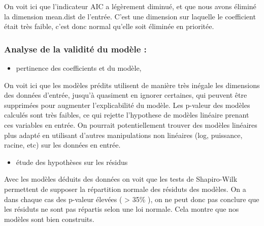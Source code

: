 \documentclass[
]{article}
\providecommand{\tightlist}{%
  \setlength{\itemsep}{0pt}\setlength{\parskip}{0pt}}
\begin{document}
On voit ici que l'indicateur AIC a légèrement diminué, et que nous avons
éliminé la dimension mean.dist de l'entrée. C'est une dimension sur
laquelle le coefficient était très faible, c'est donc normal qu'elle
soit éliminée en prioritée.

\hypertarget{analyse-de-la-validituxe9-du-moduxe8le}{%
\subsubsection{Analyse de la validité du modèle
:}\label{analyse-de-la-validituxe9-du-moduxe8le}}

\begin{itemize}
\tightlist
\item
  pertinence des coefficients et du modèle,
\end{itemize}

On voit ici que les modèles prédits utilisent de manière très inégale
les dimensions des données d'entrée, jusqu'à quasiment en ignorer
certaines, qui peuvent être supprimées pour augmenter l'explicabilité du
modèle. Les p-valeur des modèles calculés sont très faibles, ce qui
rejette l'hypothese de modèles linéaire prenant ces variables en entrée.
On pourrait potentiellement trouver des modèles linéaires plus adapté en
utilisant d'autres manipulations non linéaires (log, puissance, racine,
etc) sur les données en entrée.

\begin{itemize}
\tightlist
\item
  étude des hypothèses sur les résidus
\end{itemize}

Avec les modèles déduits des données on voit que les tests de
Shapiro-Wilk permettent de supposer la répartition normale des résiduts
des modèles. On a dans chaque cas des p-valeur élevées ( \textgreater{}
35\% ), on ne peut donc pas conclure que les résiduts ne sont pas
répartis selon une loi normale. Cela montre que nos modèles sont bien
construits.
\end{document}
